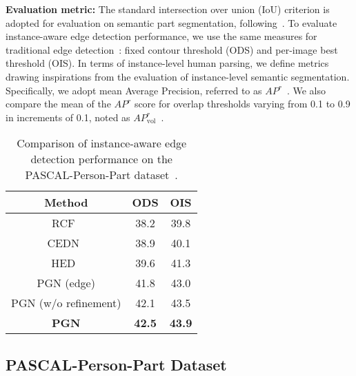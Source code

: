 \documentclass[runningheads]{llncs}
\begin{document}
\textbf{Evaluation metric:}
The standard intersection over union (IoU) criterion is adopted for evaluation on semantic part segmentation, following~\cite{chen2014detect}. To evaluate instance-aware edge detection performance, we use the same measures for traditional edge detection~\cite{Liu_2017_CVPR}: fixed contour threshold (ODS) and per-image best threshold (OIS). In terms of instance-level human parsing, we define metrics drawing inspirations from the evaluation of instance-level semantic segmentation. Specifically, we adopt mean Average Precision, referred to as $AP^r$~\cite{hariharan2014simultaneous}. We also compare the mean of the $AP^r$ score for overlap thresholds varying from 0.1 to 0.9 in increments of 0.1, noted as $AP^r_\text{vol}$~\cite{li2017holistic}.





\begin{table}[t]
\centering
\small
\caption{Comparison of instance-aware edge detection performance on the PASCAL-Person-Part dataset~\cite{chen2014detect}.}
\tabcolsep 0.25in
\begin{tabular}{ccc}
\toprule[0.7pt]
   Method                                       & ODS            & OIS   \\ \hline
   RCF~\cite{Liu_2017_CVPR}                     & 38.2           & 39.8   \\
   CEDN~\cite{yang2016object}                   & 38.9           & 40.1      \\
   HED~\cite{xie2015holistically}               & 39.6           & 41.3    \\  \hline
   PGN (edge)                                   & 41.8           & 43.0         \\
   PGN (w/o refinement)                         & 42.1           & 43.5         \\  \hline
   \textbf{PGN}                                 & \textbf{42.5}  & \textbf{43.9}      \\
\toprule[0.7pt]
\end{tabular}
\vspace{-8mm}
\label{tab: edge_result}
\end{table}





\subsection{PASCAL-Person-Part Dataset}
\end{document}
